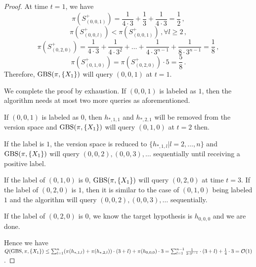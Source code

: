 \begin{proof}
    At time $t=1$, we have
    \[\pi(S_{(0,0,1)}^+) = \frac{1}{4 \cdot 3} + \frac{1}{3} + \frac{1}{4 \cdot 3} =\frac{1}{2}\,,\] 
    \[\pi(S_{(0,0,l)}^+) < \pi(S_{(0,0,1)}^+)\,,\forall l\geq 2\,,\]
    \[\pi(S_{(0,2,0)}^+) = \frac{1}{4\cdot 3} +\frac{1}{4\cdot 3^2} +\ldots +\frac{1}{4\cdot 3^{n-1}} +\frac{1}{8\cdot 3^{n-1}} = \frac{1}{8}\,,\]
    \[\pi(S_{(0,1,0)}^+) = \pi(S_{(0,2,0)}^+) \cdot 5 =\frac{5}{8}\,.\]
    Therefore, $\textrm{GBS}(\pi,\{X_1\})$ will query $(0,0,1)$ at $t=1$.
    
    We complete the proof by exhaustion. 
    If $(0,0,1)$ is labeled as $1$, then the algorithm needs at most two more queries as aforementioned.
    
    If $(0,0,1)$ is labeled as $0$, then $h_{*,1,1}$ and $h_{*,2,1}$ will be removed from the version space and $\textrm{GBS}(\pi,\{X_1\})$ will query $(0,1,0)$ at $t=2$ then.
    
    If the label is $1$, the version space is reduced to $\{h_{*,1,l}|l=2,\ldots,n\}$ and $\textrm{GBS}(\pi,\{X_1\})$ will query $(0,0,2),(0,0,3),\ldots$ sequentially until receiving a positive label.
    
    If the label of $(0,1,0)$ is $0$, $\textrm{GBS}(\pi,\{X_1\})$ will query $(0,2,0)$ at time $t=3$.
    If the label of $(0,2,0)$ is $1$, then it is similar to the case of  $(0,1,0)$ being labeled $1$ and the algorithm will query $(0,0,2),(0,0,3),\ldots$ sequentially.
    
    If the label of $(0,2,0)$ is $0$, we know the target hypothesis is $h_{0,0,0}$ and we are done.
    
    Hence we have $Q(\textrm{GBS},\pi,\{X_1\}) \leq \sum_{l=1}^n (\pi(h_{*,1,l}) + \pi(h_{*,2,l})) \cdot (3+ l) + \pi(h_{0,0,0})\cdot 3 = \sum_{l=1}^{n-1} \frac{1}{2\cdot 3^{l-1}}  \cdot (3+ l) + \frac{1}{4}\cdot 3 = \mathcal{O}(1)$.
\end{proof}